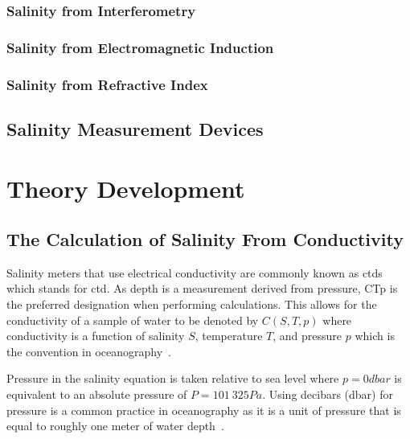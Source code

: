 \subsection{Salinity from Interferometry}



\subsection{Salinity from Electromagnetic Induction}



\subsection{Salinity from Refractive Index}

\section{Salinity Measurement Devices}\label{sec:salinity-measurement-devices}


\chapter{Theory Development}\label{ch:theory-development}

\section{The Calculation of Salinity From Conductivity}\label{sec:salinity-conductivity-relationship}

Salinity meters that use electrical conductivity are commonly known as \gls{ctd}s which stands for \gls{ctd}.
As depth is a measurement derived from pressure, CTp is the preferred designation when performing calculations.
This allows for the conductivity of a sample of water to be denoted by $C(S, T, p)$ where conductivity is a function of salinity $S$, temperature $T$, and pressure $p$ which is the convention in oceanography~\cite{lewis_salinity_definition_and_calculation_1978}.

Pressure in the salinity equation is taken relative to sea level where $p = 0 dbar$ is equivalent to an absolute pressure of $P = 101\ 325 Pa$.
Using decibars (dbar) for pressure is a common practice in oceanography as it is a unit of pressure that is equal to roughly one meter of water depth~\cite{seabird_dbar_to_depth_2024}.

